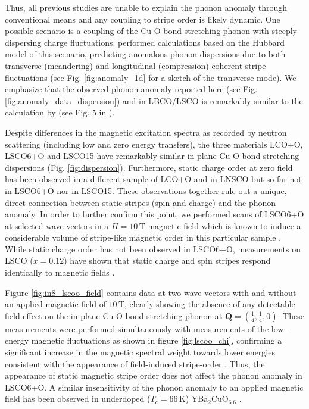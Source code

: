 Thus, all previous studies are unable to explain the phonon anomaly through conventional means and any coupling to stripe order is likely dynamic. One possible scenario is a coupling of the Cu-O bond-stretching phonon with steeply dispersing charge fluctuations. \citeauthor{Kaneshita2002} performed calculations based on the Hubbard model of this scenario, predicting anomalous phonon dispersions due to both transverse (meandering) and longitudinal (compression) coherent stripe fluctuations \cite{Kaneshita2002} (see Fig. \ref{fig:anomaly_1d} for a sketch of the transverse mode). We emphasize that the observed phonon anomaly reported here (see Fig. \ref{fig:anomaly_data_dispersion}) and in LBCO/LSCO \cite{Reznik2006, Reznik2007} is remarkably similar to the calculation by \citeauthor{Kaneshita2002} (see Fig. 5 in \cite{Kaneshita2002}).

Despite differences in the magnetic excitation spectra as recorded by neutron scattering (including low and zero energy transfers), the three materials LCO+O, LSCO6+O and LSCO15 have remarkably similar in-plane Cu-O bond-stretching dispersions (Fig. \ref{fig:dispersion}). Furthermore, static charge order at zero field has been observed in a different sample of LCO+O \cite{Zhang2018} and in LNSCO \cite{Tranquada1996} but so far not in LSCO6+O nor in LSCO15. These observations together rule out a unique, direct connection between static stripes (spin and charge) and the phonon anomaly. In order to further confirm this point, we performed scans of LSCO6+O at selected wave vectors in a $H=10\,\text{T}$ magnetic field which is known to induce a considerable volume of stripe-like magnetic order in this particular sample \cite{Holm2019}. While static charge order has not been observed in LSCO6+O, measurements on LSCO ($x=0.12$) have shown that static charge and spin stripes respond identically to magnetic fields \cite{Christensen2014}.

Figure \ref{fig:in8_lscoo_field} contains data at two wave vectors with and without an applied magnetic field of $10\,\text{T}$, clearly showing the absence of any detectable field effect on the in-plane Cu-O bond-stretching phonon at $\bm{Q}=(\frac{1}{4},\frac{1}{4},0)$. These measurements were performed simultaneously with measurements of the low-energy magnetic fluctuations as shown in figure \ref{fig:lscoo_chi}, confirming a significant increase in the magnetic spectral weight towards lower energies consistent with the appearance of field-induced stripe-order \cite{Holm2019}. Thus, the appearance of static magnetic stripe order does not affect the phonon anomaly in LSCO6+O. A similar insensitivity of the phonon anomaly to an applied magnetic field has been observed in underdoped ($T_\text{c} = 66\,\text{K}$) YBa$_2$CuO$_{6.6}$ \cite{Reznik2016}.

